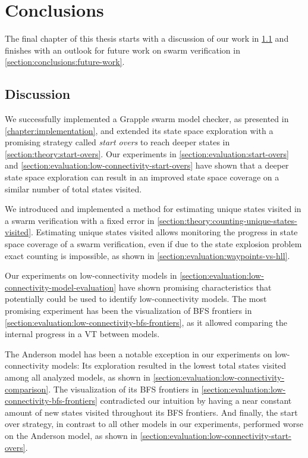 \documentclass[
fancyheadings, %
%
%
]{stsreprt}
\begin{document}
\chapter{Conclusions}
\label{chapter:conclusions}

The final chapter of this thesis starts with a discussion of our work in \cref{section:conclusions:discussion} and finishes with an outlook for future work on swarm verification in \cref{section:conclusions:future-work}.

\section{Discussion}
\label{section:conclusions:discussion}

We successfully implemented a Grapple swarm model checker, as presented in \cref{chapter:implementation}, and extended its state space exploration with a promising strategy called \emph{start overs} to reach deeper states in \cref{section:theory:start-overs}.
Our experiments in \cref{section:evaluation:start-overs} and \cref{section:evaluation:low-connectivity-start-overs} have shown that a deeper state space exploration can result in an improved state space coverage on a similar number of total states visited.

We introduced and implemented a method for estimating unique states visited in a swarm verification with a fixed error in \cref{section:theory:counting-unique-states-visited}.
Estimating unique states visited allows monitoring the progress in state space coverage of a swarm verification, even if due to the state explosion problem exact counting is impossible, as shown in \cref{section:evaluation:waypoints-vs-hll}.

Our experiments on low-connectivity models in \cref{section:evaluation:low-connectivity-model-evaluation} have shown promising characteristics that potentially could be used to identify low-connectivity models.
The most promising experiment has been the visualization of BFS frontiers in \cref{section:evaluation:low-connectivity-bfs-frontiers}, as it allowed comparing the internal progress in a VT between models.

The Anderson model has been a notable exception in our experiments on low-connectivity models:
Its exploration resulted in the lowest total states visited among all analyzed models, as shown in \cref{section:evaluation:low-connectivity-comparison}.
The visualization of its BFS frontiers in \cref{section:evaluation:low-connectivity-bfs-frontiers} contradicted our intuition by having a near constant amount of new states visited throughout its BFS frontiers.
And finally, the start over strategy, in contrast to all other models in our experiments, performed worse on the Anderson model, as shown in \cref{section:evaluation:low-connectivity-start-overs}.
\end{document}
